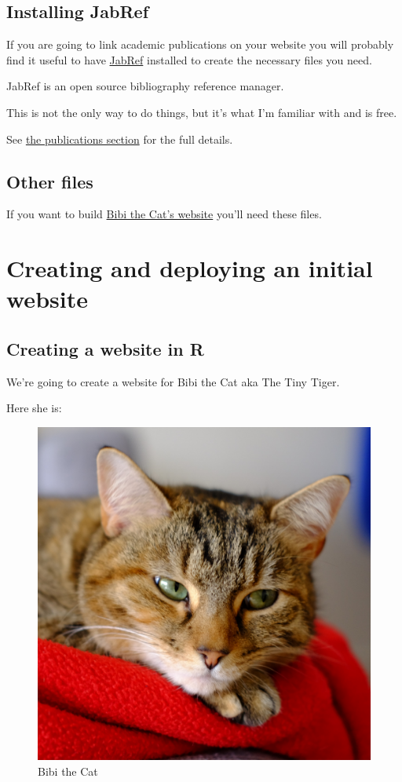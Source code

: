 \documentclass[12pt,]{book}
\theoremstyle{definition}
\theoremstyle{definition}
\theoremstyle{definition}
\theoremstyle{remark}
\begin{document}
\section{Installing JabRef}\label{installing-jabref}

If you are going to link academic publications on your website you will
probably find it useful to have \href{http://www.jabref.org/}{JabRef}
installed to create the necessary files you need.

JabRef is an open source bibliography reference manager.

This is not the only way to do things, but it's what I'm familiar with
and is free.

See \protect\hyperlink{creating-publication-files}{the publications
section} for the full details.

\section{Other files}\label{other-files}

If you want to build \href{https://bibi-web.netlify.com/}{Bibi the Cat's
website} you'll need these files.

\chapter{Creating and deploying an initial
website}\label{creating-and-deploying-an-initial-website}

\section{Creating a website in R}\label{creating-a-website-in-r}

We're going to create a website for Bibi the Cat aka The Tiny Tiger.

Here she is:



\begin{figure}
\includegraphics[width=0.5\linewidth]{img/portrait} \caption{Bibi the Cat}\label{fig:bibi-cat}
\end{figure}
\end{document}
